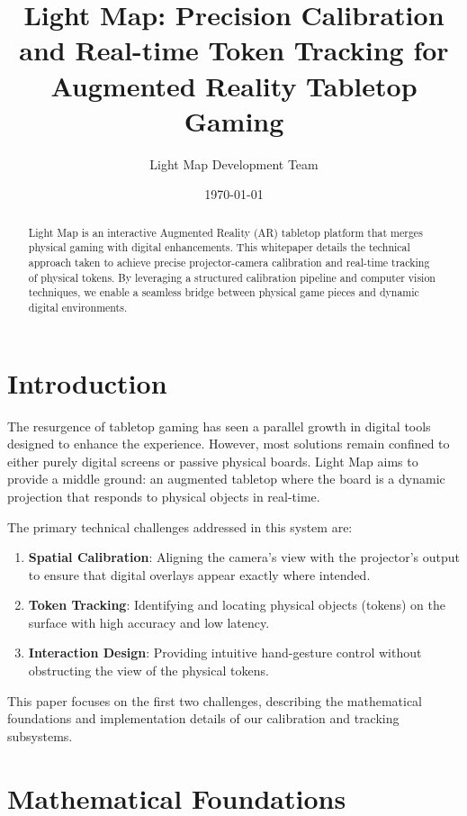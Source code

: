 \documentclass[11pt,a4paper]{article}
\title{Light Map: Precision Calibration and Real-time Token Tracking for Augmented Reality Tabletop Gaming}
\author{Light Map Development Team}
\date{\today}
\begin{document}
\maketitle

\begin{abstract}
Light Map is an interactive Augmented Reality (AR) tabletop platform that merges physical gaming with digital enhancements. This whitepaper details the technical approach taken to achieve precise projector-camera calibration and real-time tracking of physical tokens. By leveraging a structured calibration pipeline and computer vision techniques, we enable a seamless bridge between physical game pieces and dynamic digital environments.
\end{abstract}

\section{Introduction}

The resurgence of tabletop gaming has seen a parallel growth in digital tools designed to enhance the experience. However, most solutions remain confined to either purely digital screens or passive physical boards. Light Map aims to provide a middle ground: an augmented tabletop where the board is a dynamic projection that responds to physical objects in real-time.

The primary technical challenges addressed in this system are:
\begin{enumerate}
    \item \textbf{Spatial Calibration}: Aligning the camera's view with the projector's output to ensure that digital overlays appear exactly where intended.
    \item \textbf{Token Tracking}: Identifying and locating physical objects (tokens) on the surface with high accuracy and low latency.
    \item \textbf{Interaction Design}: Providing intuitive hand-gesture control without obstructing the view of the physical tokens.
\end{enumerate}

This paper focuses on the first two challenges, describing the mathematical foundations and implementation details of our calibration and tracking subsystems.

\section{Mathematical Foundations}
\end{document}
